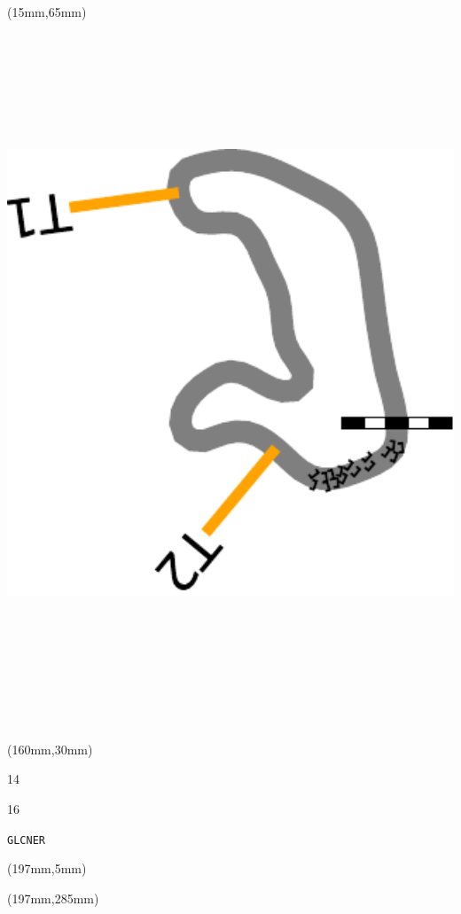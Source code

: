 \begin{textblock*}{185mm}(15mm,65mm)%
\centering
\mbox{\includegraphics[width=185mm,height=210mm,keepaspectratio]{PT/GLCNER.pdf}}
\end{textblock*}
\begin{textblock*}{40mm}(160mm,30mm)%
\Large
\par{} 
\par14 
\par16 
\par\hfill\tiny\tt GLCNER\\
\end{textblock*}
\begin{textblock*}{20mm}(197mm,5mm)%
\fbox{\thepage}
\label{GLCNER}
\end{textblock*}
\begin{textblock*}{20mm}(197mm,285mm)%
\fbox{\thepage}
\end{textblock*}

